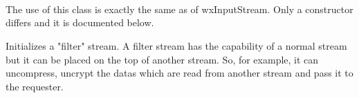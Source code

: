 \section{}\label{wxfilterinputstream}


\\


The use of this class is exactly the same as of wxInputStream. Only a constructor
differs and it is documented below.



Initializes a "filter" stream. A filter stream has the capability of a normal
stream but it can be placed on the top of another stream. So, for example, it
can uncompress, uncrypt the datas which are read from another stream and pass it
to the requester.
